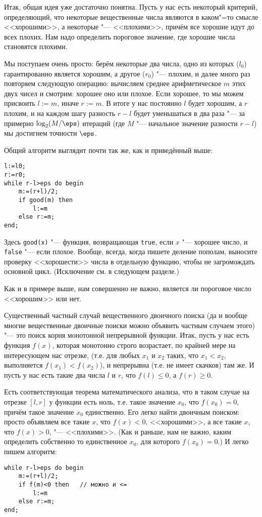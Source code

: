Итак, общая идея уже достаточно понятна. 
Пусть у нас есть некоторый критерий, определяющий, что некоторые вещественные числа являются в каком"=то смысле <<хорошими>>, а некоторые "--- <<плохими>>,
причём все хорошие идут до всех плохих. 
Нам надо определить пороговое значение, где хорошие числа становятся плохими.

Мы поступаем очень просто: берём некоторые два числа, одно из которых ($l_0$) гарантированно является хорошим, а другое ($r_0$) "--- плохим,
и далее много раз повторяем следующую операцию: вычисляем среднее арифметическое $m$ этих двух чисел и смотрим: хорошее оно или плохое.
Если хорошее, то мы можем присвоить $l:=m$, иначе $r:=m$. 
В итоге у нас постоянно $l$ будет хорошим, а $r$ плохим, и на каждом шагу разность $r-l$ будет уменьшаться в два раза 
"--- за примерно $\log_2(M/\eps)$ итераций (где $M$ "--- начальное значение разности $r-l$) мы достигнем точности $\eps$.

Общий алгоритм выглядит почти так же, как и приведённый выше:
\begin{codesampleo}\begin{verbatim}
l:=l0;
r:=r0;
while r-l>eps do begin    
    m:=(r+l)/2;
    if good(m) then
        l:=m
    else r:=m;
end;
\end{verbatim}
\end{codesampleo}

Здесь \verb`good(x)` "--- функция, возвращающая \verb`true`, если $x$ "--- хорошее число, и \verb`false` "--- если плохое. 
Вообще, всегда, когда пишете деление пополам, выносите проверку <<хорошести>> числа в отдельную функцию, чтобы не загромождать основной цикл.
(Исключение см. в следующем разделе.)

Как и в примере выше, нам совершенно не важно, является ли пороговое число <<хорошим>> или нет.

Существенный частный случай вещественного двоичного поиска (да и вообще многие вещественные двоичные поиски можно объявить частным случаем этого)
"--- это поиск корня монотонной непрерывной функции.
Итак, пусть у нас есть функция $f(x)$, которая монотонно строго возрастает, по крайней мере на интересующем нас отрезке, (т.е. для любых $x_1$ и $x_2$ таких, что $x_1<x_2$, выполняется $f(x_1)<f(x_2)$),
и непрерывна (т.е. не имеет скачков) там же.
И пусть у нас есть такие два числа $l$ и $r$, что $f(l)\leq0$, а $f(r)\geq0$.

Есть соответствующая теорема математического анализа, что в таком случае на отрезке $[l,r]$ у функции есть ноль,
т.е. такое значение $x_0$, что $f(x_0)=0$, причём такое значение $x_0$ единственно. 
Его легко найти двоичным поиском: просто объявляем все такие $x$, что $f(x)<0$, <<хорошими>>,
а все такие $x$, что $f(x)>0$, "--- <<плохими>>. 
(Как и раньше, нам не важно, каким определить собственно то единственное $x_0$, для которого $f(x_0)=0$.)
И легко пишем алгоритм:
\begin{codesampleo}\begin{verbatim}
while r-l>eps do begin    
    m:=(r+l)/2;
    if f(m)<0 then   // можно и <=
        l:=m
    else r:=m;
end;
\end{verbatim}
\end{codesampleo}

